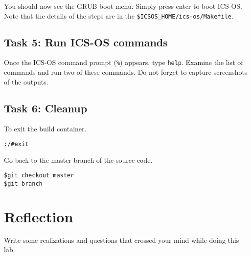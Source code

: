 \documentclass[a4paper, 11pt,oneside]{article}
\begin{document}
You should now see the GRUB boot menu. Simply press enter to boot ICS-OS. Note 
that the details of the steps are in the \texttt{\$ICSOS\_HOME/ics-os/Makefile}.

\subsection*{Task 5: Run ICS-OS commands}
Once the ICS-OS command prompt (\texttt{\%}) appears, type \texttt{help}. 
Examine the list of commands and run two of these commands. Do not forget 
to capture screenshots of the outputs.

\subsection*{Task 6: Cleanup}
To exit the build container. 
\begin{verbatim}
:/#exit
\end{verbatim}

Go back to the master branch of the source code.
\begin{verbatim}
$git checkout master
$git branch
\end{verbatim}

\section{Reflection}
Write some realizations and questions that crossed your mind while doing this 
lab. 
\end{document}
